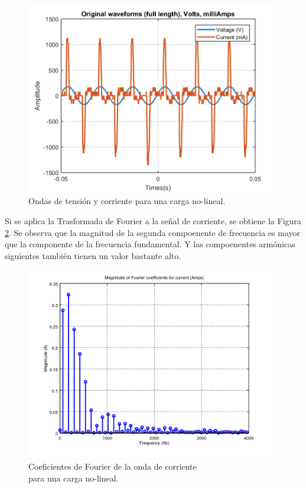 \documentclass[journal]{IEEEtran}
\begin{document}
\begin{figure}[h]
\centering
\includegraphics[clip,width=\columnwidth]
{original_waveform_computer.png}
\caption{Ondas de tensión y corriente para una carga
no-lineal.}
\label{original_no_lineal_load}
\end{figure}

Si se aplica la Trasformada de Fourier a la señal de 
corriente, se obtiene la Figura 
\ref{fourier_corrent_coefficients_nonlinear}. Se observa
que la magnitud de la segunda compoenente de frecuencia 
es mayor que la componente de la frecuencia fundamental. 
Y las compoenentes armónicas siguientes 
también tienen un valor bastante alto. 

\begin{figure}[h]
\centering
\includegraphics[clip,width=\columnwidth]
{zoomed_current_furier_coefficients_computer.png}
\caption{Coeficientes de Fourier de la onda de corriente\\
para una carga no-lineal.}
\label{fourier_corrent_coefficients_nonlinear}
\end{figure}
\end{document}
